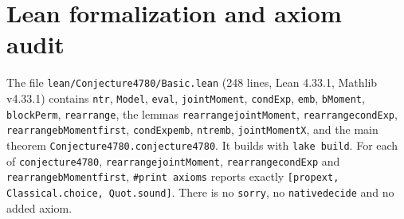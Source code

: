 \documentclass[11pt]{article}
\theoremstyle{definition}
\theoremstyle{remark}
\renewcommand{\_}{\oldus\allowbreak}
\begin{document}
\section{Lean formalization and axiom audit}

The file \texttt{lean/Conjecture4780/Basic.lean} (248 lines, Lean 4.33.1, Mathlib v4.33.1)
contains \texttt{ntr}, \texttt{Model}, \texttt{eval}, \texttt{jointMoment}, \texttt{condExp},
\texttt{emb}, \texttt{bMoment}, \texttt{blockPerm}, \texttt{rearrange}, the lemmas
\texttt{rearrange\_jointMoment}, \texttt{rearrange\_condExp}, \texttt{rearrange\_bMoment\_first},
\texttt{condExp\_emb}, \texttt{ntr\_emb}, \texttt{jointMoment\_X}, and the main theorem
\texttt{Conjecture4780.conjecture4780}. It builds with \texttt{lake build}. For each of
\texttt{conjecture4780}, \texttt{rearrange\_jointMoment}, \texttt{rearrange\_condExp} and
\texttt{rearrange\_bMoment\_first}, \texttt{\#print axioms} reports exactly
\texttt{[propext, Classical.choice, Quot.sound]}. There is no \texttt{sorry}, no
\texttt{native\_decide} and no added axiom.
\end{document}
